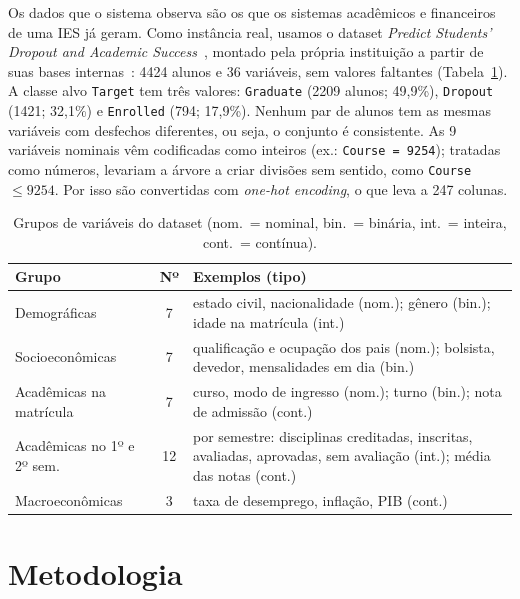 \documentclass[runningheads]{llncs}
\begin{document}
Os dados que o sistema observa são os que os sistemas acadêmicos e financeiros de uma
IES já geram. Como instância real, usamos o dataset \emph{Predict Students' Dropout and
Academic Success}~\cite{uci_dataset}, montado pela própria instituição a partir de suas
bases internas~\cite{realinho2022}: 4424 alunos e 36 variáveis, sem valores faltantes
(Tabela~\ref{tab:dados}). A classe alvo \texttt{Target} tem três valores:
\texttt{Graduate} (2209 alunos; 49,9\%), \texttt{Dropout} (1421; 32,1\%) e
\texttt{Enrolled} (794; 17,9\%). Nenhum par de alunos tem as mesmas variáveis com
desfechos diferentes, ou seja, o conjunto é consistente. As 9 variáveis nominais vêm
codificadas como inteiros (ex.: \texttt{Course = 9254}); tratadas como números, levariam
a árvore a criar divisões sem sentido, como \texttt{Course} $\le 9254$. Por isso são
convertidas com \emph{one-hot encoding}, o que leva a 247 colunas.

\begin{table}[t]
\caption{Grupos de variáveis do dataset (nom.\ = nominal, bin.\ = binária, int.\ =
inteira, cont.\ = contínua).}\label{tab:dados}
\centering\scriptsize
\begin{tabularx}{\textwidth}{@{}lcX@{}}
\toprule
Grupo & Nº & Exemplos (tipo)\\
\midrule
Demográficas & 7 & estado civil, nacionalidade (nom.); gênero (bin.); idade na matrícula (int.)\\
Socioeconômicas & 7 & qualificação e ocupação dos pais (nom.); bolsista, devedor,
  mensalidades em dia (bin.)\\
Acadêmicas na matrícula & 7 & curso, modo de ingresso (nom.); turno (bin.); nota de admissão (cont.)\\
Acadêmicas no 1º e 2º sem. & 12 & por semestre: disciplinas creditadas, inscritas,
  avaliadas, aprovadas, sem avaliação (int.); média das notas (cont.)\\
Macroeconômicas & 3 & taxa de desemprego, inflação, PIB (cont.)\\
\bottomrule
\end{tabularx}
\end{table}

\section{Metodologia}
\end{document}
